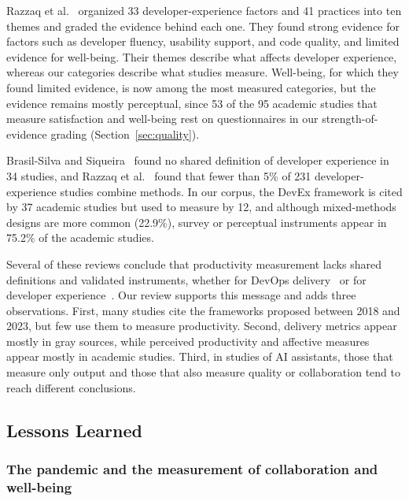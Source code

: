\documentclass[preprint,number]{elsarticle}
\begin{document}
Razzaq et al.~\cite{P0604} organized 33 developer-experience factors and 41 practices into ten themes and graded the evidence behind each one. They found strong evidence for factors such as developer fluency, usability support, and code quality, and limited evidence for well-being. Their themes describe what affects developer experience, whereas our categories describe what studies measure. Well-being, for which they found limited evidence, is now among the most measured categories, but the evidence remains mostly perceptual, since 53 of the 95 academic studies that measure satisfaction and well-being rest on questionnaires in our strength-of-evidence grading (Section~\ref{sec:quality}).

Brasil-Silva and Siqueira~\cite{P0476} found no shared definition of developer experience in 34 studies, and Razzaq et al.~\cite{P0593} found that fewer than 5\% of 231 developer-experience studies combine methods. In our corpus, the DevEx framework is cited by 37 academic studies but used to measure by 12, and although mixed-methods designs are more common (22.9\%), survey or perceptual instruments appear in 75.2\% of the academic studies.

Several of these reviews conclude that productivity measurement lacks shared definitions and validated instruments, whether for DevOps delivery~\cite{leite2019devops} or for developer experience~\cite{P0476, P0593}. Our review supports this message and adds three observations. First, many studies cite the frameworks proposed between 2018 and 2023, but few use them to measure productivity. Second, delivery metrics appear mostly in gray sources, while perceived productivity and affective measures appear mostly in academic studies. Third, in studies of AI assistants, those that measure only output and those that also measure quality or collaboration tend to reach different conclusions.

\subsection{Lessons Learned}

\subsubsection{The pandemic and the measurement of collaboration and well-being}
\end{document}
